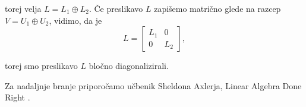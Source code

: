 \documentclass[a4paper,12pt]{article}
\begin{document}
torej velja $L = L_1 \oplus L_2$.
Če preslikavo $L$ zapišemo matrično glede na razcep $V = U_1 \oplus U_2$, vidimo, da je
\[L=\begin{bmatrix}
    L_1 & 0\\
    0 & L_2
\end{bmatrix},\]

torej smo preslikavo $L$ bločno diagonalizirali.

Za nadaljnje branje priporočamo učbenik Sheldona Axlerja, Linear Algebra Done Right \cite{axler}.




\end{document}
